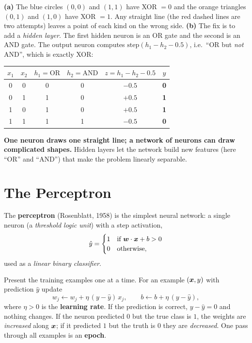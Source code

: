 \begin{explain}
\textbf{(a)} The blue circles $(0,0)$ and $(1,1)$ have XOR $=0$ and the orange triangles $(0,1)$ and $(1,0)$ have XOR $=1$. Any straight line (the red dashed lines are two attempts) leaves a point of each kind on the wrong side. \textbf{(b)} The fix is to add a \emph{hidden layer}. The first hidden neuron is an OR gate and the second is an AND gate. The output neuron computes $\text{step}(h_1-h_2-0.5)$, i.e.\ ``OR but \emph{not} AND'', which is exactly XOR:
\end{explain}

\begin{center}
\begin{tabular}{@{}cc|cc|c|c@{}}
\toprule
$x_1$ & $x_2$ & $h_1=\text{OR}$ & $h_2=\text{AND}$ & $z=h_1-h_2-0.5$ & $y$\\
\midrule
0 & 0 & 0 & 0 & $-0.5$ & \textbf{0}\\
0 & 1 & 1 & 0 & $+0.5$ & \textbf{1}\\
1 & 0 & 1 & 0 & $+0.5$ & \textbf{1}\\
1 & 1 & 1 & 1 & $-0.5$ & \textbf{0}\\
\bottomrule
\end{tabular}
\end{center}

\begin{keyidea}
\textbf{One neuron draws one straight line; a network of neurons can draw complicated shapes.} Hidden layers let the network build new features (here ``OR'' and ``AND'') that make the problem linearly separable.
\end{keyidea}

\section{The Perceptron}

\begin{definition}[: Perceptron]
The \textbf{perceptron} (Rosenblatt, 1958) is the simplest neural network: a single neuron (a \emph{threshold logic unit}) with a step activation,
\[
  \hat y=\begin{cases}1&\text{if }\boldsymbol{w}\cdot\boldsymbol{x}+b>0\\0&\text{otherwise,}\end{cases}
\]
used as a \emph{linear binary classifier}.
\end{definition}

\begin{definition}
Present the training examples one at a time. For an example $(\boldsymbol{x},y)$ with prediction $\hat y$ update
\[
  w_j\leftarrow w_j+\eta\,(y-\hat y)\,x_j,\qquad b\leftarrow b+\eta\,(y-\hat y),
\]
where $\eta>0$ is the \textbf{learning rate}. If the prediction is correct, $y-\hat y=0$ and nothing changes. If the neuron predicted $0$ but the true class is $1$, the weights are \emph{increased} along $\boldsymbol{x}$; if it predicted $1$ but the truth is $0$ they are \emph{decreased}. One pass through all examples is an \textbf{epoch}.
\end{definition}


